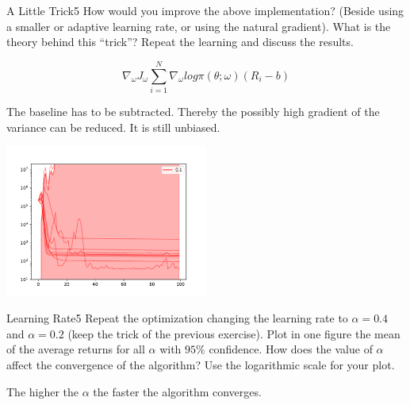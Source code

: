 \begin{questions}
\begin{question}{A Little Trick}{5}
	How would you improve the above implementation? (Beside using a smaller or adaptive learning rate, or using the natural gradient). What is the theory behind this ``trick''? Repeat the learning and discuss the results.
	
	\begin{answer}
	\begin{equation}
	\nabla_\omega J_\omega \sum_{i=1}^{N} \nabla_\omega log \pi (\theta; \omega)(R_i - b)
	\end{equation}
		
	The baseline has to be subtracted. Thereby the possibly high gradient of the variance can be reduced. It is still unbiased.
	
	\begin{center}
		\includegraphics[width=0.5\textwidth]{img/PG-c.pdf}
	\end{center}
	
	\end{answer}

\end{question}
	


\begin{question}{Learning Rate}{5}
	Repeat the optimization changing the learning rate to $\alpha=0.4$ and $\alpha = 0.2$ (keep the trick of the previous exercise).
	Plot in one figure the mean of the average returns for all $\alpha$ with $95\%$ confidence.
	How does the value of $\alpha$ affect the convergence of the algorithm? 
	Use the logarithmic scale for your plot.
		
\begin{answer}
The higher the $\alpha$ the faster the algorithm converges.


\end{answer}
\end{question}
\end{questions}
